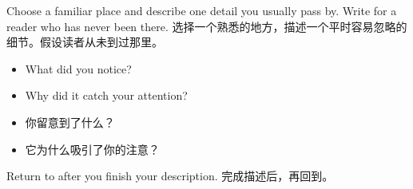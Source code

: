  {Choose a familiar place and describe one detail you usually pass by. Write for a reader who has never been there.}
 {选择一个熟悉的地方，描述一个平时容易忽略的细节。假设读者从未到过那里。}
 {\begin{itemize}\item What did you notice?\item Why did it catch your attention?\end{itemize}}
 {\begin{itemize}\item 你留意到了什么？\item 它为什么吸引了你的注意？\end{itemize}}
 {Return to  after you finish your description.}
 {完成描述后，再回到。}
